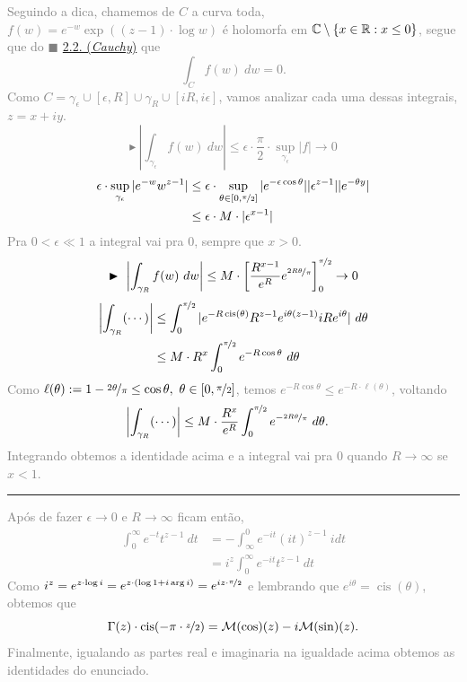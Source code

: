 \newcommand{\ho}{\mathcal{O}}
\vspace{5cm}
\textcolor{gray}{
  Seguindo a dica, chamemos de \(C\) a curva toda, \(f(w) = e^{-w} \exp ((z-1)\cdot \log w)\) é holomorfa em \(\mathbb{C}\setminus \{x \in \mathbb{R} : x \leq 0\}\), segue que do \(\blacksquare\) \hyperlink{thm222}{2.2. (\emph{Cauchy})} \cite[pag. 39]{shakarchi} que 
  \[\int_{C} f(w) \ dw = 0.\]   
  Como \(C = \gamma_\epsilon \cup [\epsilon, R] \cup \gamma_R \cup [iR, i\epsilon]\), vamos analizar cada uma dessas integrais, \(z = x+iy\).   
    \[\blacktriangleright \  \left|\int_{\gamma_\epsilon} f(w) \ dw\right| \leq \epsilon \cdot \frac{\pi}{2} \cdot \sup_{\gamma_\epsilon} |f| \to 0\]
    \vspace{-0.4cm}
    \begin{align*}
      \epsilon \cdot \sup_{\gamma_\epsilon} |e^{-w} w^{z-1}| &\leq \epsilon \cdot\sup_{\theta \in [0,\nicefrac{\pi}{2}]}|e^{-\epsilon \cos \theta}||\epsilon^{z-1}||e^{-\theta y}| \\ 
      &\leq \epsilon \cdot  M  \cdot| \epsilon^{x-1}|
    \end{align*}
    Pra \(0< \epsilon \ll 1\) a integral vai pra \(0\), sempre que \(x>0\). 
    \[\blacktriangleright \  \left|\int_{\gamma_R} f(w) \ dw\right| \leq M \cdot \left[\frac{R^{x-1}}{ e^R }e^{\nicefrac{2R\theta }{\pi}}\right]_0^{\nicefrac{\pi}{2}} \to 0 \]
    \vspace{-0.4cm}
    \begin{align*}
        \left|\int_{\gamma_R} (\cdots)\right| &\leq \int_0^{\nicefrac{\pi}{2}} |e^{-R\operatorname{cis(\theta)}} R^{z-1} e^{i\theta (z-1)} i R e^{i\theta} | \ d\theta  \\ 
      &\leq M \cdot R^{x}\int_0^{\nicefrac{\pi}{2}} e^{-R\cos \theta} \ d\theta  
    \end{align*}
    Como \(\ell(\theta):=  1 - \nicefrac{2\theta}{\pi}\leq \cos \theta, \ \theta \in [0, \nicefrac{\pi}{2}]\), temos \(e^{-R\cos \theta} \leq e^{-R\cdot\ell(\theta)}\), voltando 
    \begin{align*}
      \left|\int_{\gamma_R} (\cdots)\right| &\leq M \cdot \frac{R^x}{e^R}\int_0^{\nicefrac{\pi}{2}}e^{-\nicefrac{2R\theta }{\pi}} \ d\theta.
    \end{align*}
    Integrando obtemos a identidade acima e a integral vai pra \(0\) quando \(R \to \infty\) se \(x < 1\). 
    \vspace{0.2cm}
    \hrule 
    Após de fazer \(\epsilon \to 0\) e \(R\to \infty\) ficam então,  
    \begin{align*}
      \int_0^\infty e^{-t}t^{z-1} \ dt &= -\int_\infty^0 e^{-it} (it)^{z-1} \ i dt  \\ 
      &= i^z \int_0^\infty e^{-it} t^{z-1} \ dt  
    \end{align*}
    Como \(i^z = e^{z\cdot \log i} = e^{z \cdot (\log 1 + i\operatorname{arg}i)} = e^{iz\cdot \nicefrac{\pi}{2}} \) e lembrando que \(e^{i\theta} = \operatorname{cis}(\theta)\), obtemos que 
    \[\Gamma(z) \cdot \operatorname{cis}(-\pi \cdot \nicefrac{z}{2}) = \mathcal{M}(\cos)(z) - i \mathcal{M}(\sin)(z).\]
    Finalmente, igualando as partes real e imaginaria na igualdade acima obtemos as identidades do enunciado.
    }

